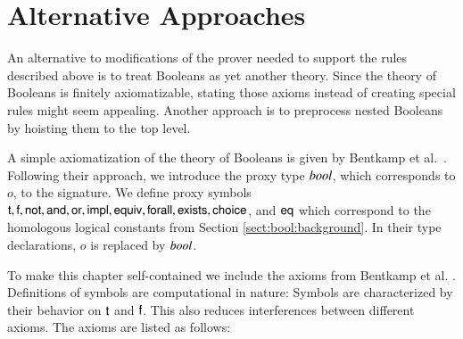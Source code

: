 \section{Alternative Approaches} 
\label{sect:bool:alternative}

An alternative to modifications of the prover needed to support the rules
described above is to treat Booleans as yet another theory. Since the theory of Booleans
is finitely axiomatizable, stating those axioms instead of creating special
rules might seem appealing. Another approach
is to preprocess nested Booleans by hoisting them to the top level.

A simple axiomatization of the theory of Booleans is given by Bentkamp et al.\ \cite{bbtvw-21-sup-lam}.
Following their approach, we introduce the proxy type ${\mathit{bool}}$, which corresponds to $o$, to the
signature. We define proxy symbols $\mathsf{t}, \mathsf{f}, \mathsf{not}, \mathsf{and}, \mathsf{or},
\mathsf{impl}, \mathsf{equiv},\allowbreak \mathsf{forall}, \mathsf{exists}, \mathsf{choice}$, and $\mathsf{eq}$ which 
correspond to the homologous logical constants from Section \ref{sect:bool:background}. In their
type declarations, $o$ is replaced by ${\mathit{bool}}$.
  
To make this chapter self-contained we include the axioms from Bentkamp et al. \cite{bbtvw-21-sup-lam}.
Definitions of symbols are computational in nature: Symbols are characterized by their behavior on $\mathsf{t}$ and $\mathsf{f}$.
This also reduces interferences between different axioms. The axioms are listed as follows:

\kern\abovedisplayskip
 
